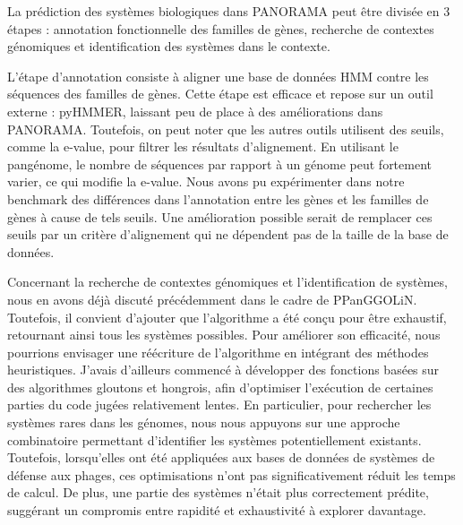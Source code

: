 La prédiction des systèmes biologiques dans PANORAMA peut être divisée en 3 étapes : annotation fonctionnelle des familles de gènes, recherche de contextes génomiques et identification des systèmes dans le contexte.

L'étape d'annotation consiste à aligner une base de données HMM contre les séquences des familles de gènes. Cette étape est efficace et repose sur un outil externe : pyHMMER, laissant peu de place à des améliorations dans PANORAMA. Toutefois, on peut noter que les autres outils utilisent des seuils, comme la e-value, pour filtrer les résultats d'alignement. En utilisant le pangénome, le nombre de séquences par rapport à un génome peut fortement varier, ce qui modifie la e-value. Nous avons pu expérimenter dans notre benchmark des différences dans l'annotation entre les gènes et les familles de gènes à cause de tels seuils. Une amélioration possible serait de remplacer ces seuils par un critère d'alignement qui ne dépendent pas de la taille de la base de données.

Concernant la recherche de contextes génomiques et l'identification de systèmes, nous en avons déjà discuté précédemment dans le cadre de PPanGGOLiN. Toutefois, il convient d’ajouter que l’algorithme a été conçu pour être exhaustif, retournant ainsi tous les systèmes possibles. Pour améliorer son efficacité, nous pourrions envisager une réécriture de l’algorithme en intégrant des méthodes heuristiques. J’avais d’ailleurs commencé à développer des fonctions basées sur des algorithmes gloutons et hongrois, afin d’optimiser l’exécution de certaines parties du code jugées relativement lentes. En particulier, pour rechercher les systèmes rares dans les génomes, nous nous appuyons sur une approche combinatoire permettant d’identifier les systèmes potentiellement existants. Toutefois, lorsqu’elles ont été appliquées aux bases de données de systèmes de défense aux phages, ces optimisations n’ont pas significativement réduit les temps de calcul. De plus, une partie des systèmes n’était plus correctement prédite, suggérant un compromis entre rapidité et exhaustivité à explorer davantage.

